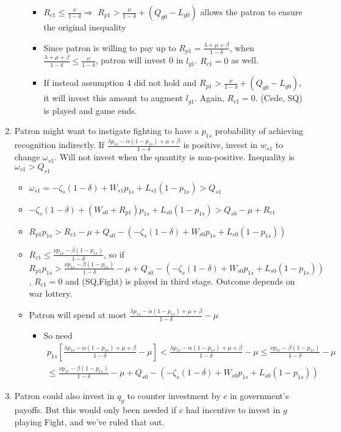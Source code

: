 \documentclass[12pt]{article}
\newcommand{\de}{\delta}
\begin{document}
\begin{enumerate}
\begin{itemize}
\begin{itemize}
					\item $R_{c1} \leq \frac{\nu}{1-\de} \Rightarrow$ $R_{p1} > \frac{\nu}{1-\de} + \left( Q_{g0} - L_{g0}\right)$ allows the patron to ensure the original inequality
					\item Since patron is willing to pay up to $R_{p1} = \frac{\lambda +\mu + \beta}{1-\de}$, when $\frac{\lambda +\mu + \beta}{1-\de} \leq \frac{\nu}{1-\de}$, patron will invest 0 in $l_{g1}$. $R_{c1} = 0$ as well.
					\item If instead assumption 4 did not hold and $R_{p1} > \frac{\nu}{1-\de} + \left( Q_{g0} - L_{g0}\right)$, it will invest this amount to augment $l_{g1}$. Again, $R_{c1} = 0$. (Cede, SQ) is played and game ends.
				\end{itemize}
		\end{itemize}
	\item Patron might want to instigate fighting to have a $p_{1s}$ probability of achieving recognition indirectly. If $\frac{\lambda p_{1s} - \alpha (1-p_{1s}) + \mu + \beta}{1 - \de}$ is positive, invest in $w_{s1}$ to change $\omega_{s1}$. Will not invest when the quantity is non-positive. Inequality is $\omega_{s1} > Q_{s1}$
		\begin{itemize}
			\item $\omega_{s1} = -\zeta_{s}(1-\de) + W_{s1}p_{1s} + L_{s1}(1-p_{1s}) > Q_{s1}$
			\item $-\zeta_{s}(1-\de) + (W_{s0}+R_{p1})p_{1s} + L_{s0}(1-p_{1s}) > Q_{s0} - \mu + R_{c1}$
			\item $R_{p1}p_{1s} > R_{c1} - \mu + Q_{s0} - \left(-\zeta_{s}(1-\de) + W_{s0}p_{1s} + L_{s0}(1-p_{1s})\right)$
			\item $R_{c1} \leq \frac{\nu p_{1s} - \beta (1-p_{1s})}{1 -\de}$, so if $R_{p1}p_{1s} > \frac{\nu p_{1s} - \beta (1-p_{1s})}{1 -\de} - \mu + Q_{s0} - \left(-\zeta_{s}(1-\de) + W_{s0}p_{1s} + L_{s0}(1-p_{1s})\right)$, $R_{c1}=0$ and (SQ,Fight) is played in third stage. Outcome depends on war lottery.
			\item Patron will spend at most $\frac{\lambda p_{1s} - \alpha (1-p_{1s}) +\mu + \beta}{1 -\de} - \mu$
				\begin{itemize}
					\item So need
						\begin{multline}
							\textstyle p_{1s}\left[\frac{\lambda p_{1s} - \alpha (1-p_{1s}) +\mu + \beta}{1 -\de} - \mu\right] < \frac{\lambda p_{1s} - \alpha (1-p_{1s}) +\mu + \beta}{1 -\de} - \mu \leq \frac{\nu p_{1s} - \beta (1-p_{1s})}{1 -\de} - \mu \\ \leq \frac{\nu p_{1s} - \beta (1-p_{1s})}{1 -\de} - \mu + Q_{s0} - \left(-\zeta_{s}(1-\de) + W_{s0}p_{1s} + L_{s0}(1-p_{1s})\right)
						\end{multline}
				\end{itemize}
		\end{itemize}
	\item Patron could also invest in $q_g$ to counter investment by $c$ in government's payoffs. But this would only been needed if $c$ had incentive to invest in $g$ playing Fight, and we've ruled that out.
\end{enumerate}
\end{document}
